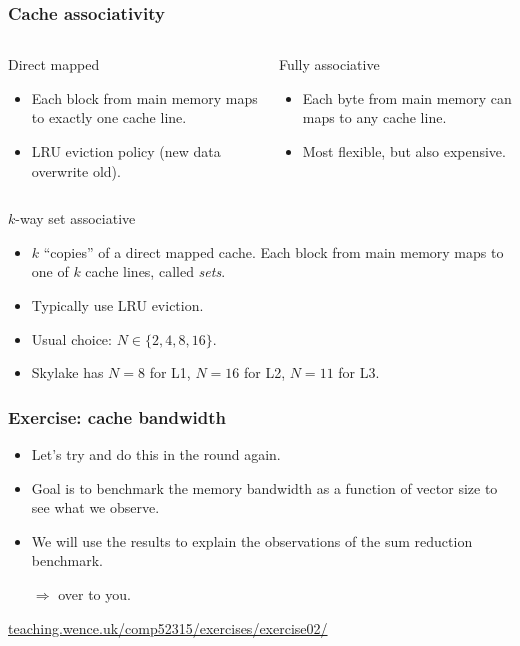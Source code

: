 \documentclass[presentation,aspectratio=43,10pt]{beamer}
\begin{document}
\begin{frame}[t]
  \frametitle{Cache associativity}
  \begin{columns}
    \begin{column}{0.48\textwidth}
      \begin{block}{Direct mapped}
        \begin{itemize}
        \item Each block from main memory maps to exactly one cache
          line.
        \item LRU eviction policy (new data overwrite old).
        \end{itemize}
      \end{block}
      \end{column}
      \begin{column}{0.48\textwidth}
        \begin{block}{Fully associative}
          \begin{itemize}
          \item Each byte from main memory can maps to any cache line.
          \item Most flexible, but also expensive.
          \end{itemize}
        \end{block}
      \end{column}
  \end{columns}
  \begin{block}{$k$-way set associative}
    \begin{itemize}
    \item $k$ ``copies'' of a direct mapped cache.  Each block from main
      memory maps to one of $k$ cache lines, called \emph{sets}.
    \item Typically use LRU eviction.
    \item Usual choice: $N \in \{2, 4, 8, 16\}$.
    \item Skylake has $N = 8$ for L1, $N = 16$ for L2, $N = 11$
      for L3.
    \end{itemize}
  \end{block}
\end{frame}


\begin{frame}
  \frametitle{Exercise: cache bandwidth}
  \begin{itemize}
  \item Let's try and do this in the round again.

  \item Goal is to benchmark the memory bandwidth as a function of
    vector size to see what we observe.
  \item We will use the results to explain the observations of the sum
    reduction benchmark.
  \item[$\Rightarrow$] over to you.
  \end{itemize}
  \begin{center}
    \url{teaching.wence.uk/comp52315/exercises/exercise02/}
  \end{center}
\end{frame}
\end{document}
